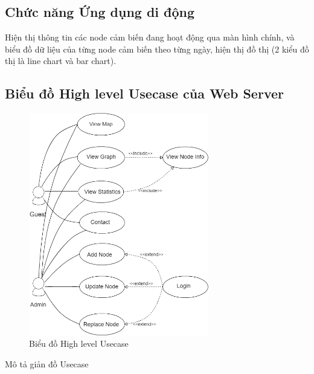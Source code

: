 \subsection*{Chức năng Ứng dụng di động}
Hiện thị thông tin các node cảm biến đang hoạt động qua màn hình chính, và biểu đồ dữ liệu của từng node cảm biến theo từng ngày, hiện thị đồ thị (2 kiểu đồ thị là line chart và bar chart).

\subsection*{Biểu đồ High level Usecase của Web Server}
\begin{figure}[H]
\centering    
\includegraphics[width=0.7\textwidth]{usecase}
\caption[Biểu đồ High level Usecase]{Biểu đồ High level Usecase }
\label{fig:usecase_diagram}
\end{figure}
Mô tả giản đồ Usecase
